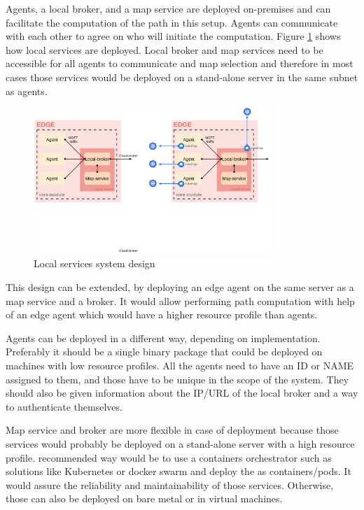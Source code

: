 Agents, a local broker, and a map service are deployed on-premises and can facilitate the computation of the path in this setup. Agents can communicate with each other to agree on who will initiate the computation. Figure \ref{fig:local_services} shows how local services are deployed. Local broker and map services need to be accessible for all agents to communicate and map selection and therefore in most cases those services would be deployed on a stand-alone server in the same subnet as agents.

\begin{figure}[H]
    \centering
    \includegraphics[width=0.8\textwidth]{pictures/local_service.png}
    \caption{ Local services system design }
    \label{fig:local_services}
\end{figure}

This design can be extended, by deploying an edge agent on the same server as a map service and a broker. It would allow performing path computation with help of an edge agent which would have a higher resource profile than agents.

Agents can be deployed in a different way, depending on implementation. Preferably it should be a single binary package that could be deployed on machines with low resource profiles. All the agents need to have an ID or NAME assigned to them, and those have to be unique in the scope of the system. They should also be given information about the IP/URL of the local broker and a way to authenticate themselves. 

Map service and broker are more flexible in case of deployment because those services would probably be deployed on a stand-alone server with a high resource profile. recommended way would be to use a containers orchestrator such as solutions like Kubernetes or docker swarm and deploy the as containers/pods. It would assure the reliability and maintainability of those services. Otherwise, those can also be deployed on bare metal or in virtual machines.